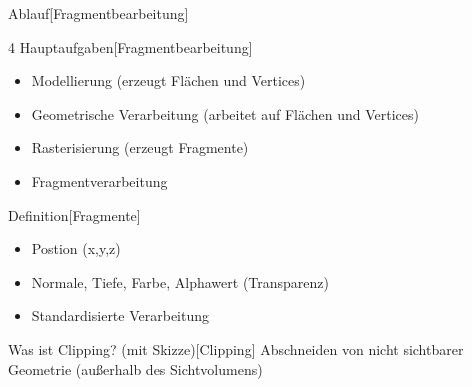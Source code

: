 \documentclass[a7paper,print]{kartei}
\begin{document}
\begin{karte}[CGIS]{Ablauf}[Fragmentbearbeitung]
\end{karte}

\begin{karte}[CGIS]{4 Hauptaufgaben}[Fragmentbearbeitung]
\begin{itemize}
\item Modellierung (erzeugt Flächen und Vertices)
\item Geometrische Verarbeitung (arbeitet auf Flächen und Vertices)
\item Rasterisierung (erzeugt Fragmente)
\item Fragmentverarbeitung
\end{itemize}
\end{karte}

\begin{karte}[CGIS]{Definition}[Fragmente]
\begin{itemize}
\item Postion (x,y,z)
\item Normale, Tiefe, Farbe, Alphawert (Transparenz)
\item Standardisierte Verarbeitung
\end{itemize}
\end{karte}

\begin{karte}[CGIS]{Was ist Clipping? (mit Skizze)}[Clipping]
Abschneiden von nicht sichtbarer Geometrie (außerhalb des Sichtvolumens)
\end{karte}
\end{document}

